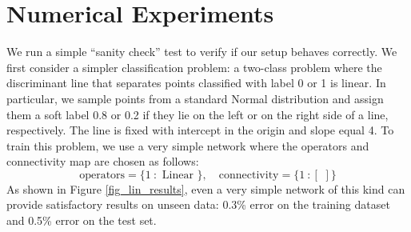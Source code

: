 \documentclass{article}
\begin{document}
\section{Numerical Experiments}\label{sec_numexp}
We run a simple ``sanity check'' test to verify if our setup behaves correctly.
We first consider a simpler classification problem: a two-class  problem where the discriminant line that separates  points classified with label 0 or 1 is  linear. 
In particular, we sample  points from a standard Normal distribution and assign them a soft label 0.8 or 0.2 if they lie on the left or on the right side of a  line, respectively.
The line is fixed with intercept in the origin and slope equal 4. 
To train this problem, we use a very simple network where the operators and connectivity map are chosen as follows:
\begin{equation*}
\text{operators} =  \{  1  \: :  \text{ Linear } \},
 \quad 
\text{connectivity} =  \{  1  \: : [\,\, ]  \}
\end{equation*}
As shown in Figure \ref{fig_lin_results}, even a very simple network of this kind can provide satisfactory results on unseen data: 0.3\% error on the training dataset and 0.5\% error on the test set. 
\end{document}
